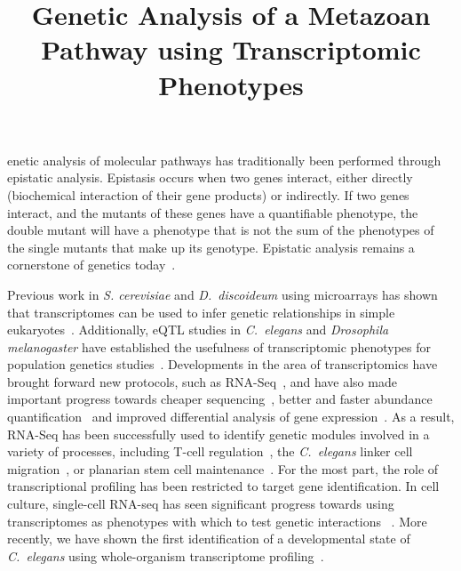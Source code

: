 \documentclass[9pt,twocolumn,twoside]{pnas-new}
\title{Genetic Analysis of a Metazoan Pathway using Transcriptomic Phenotypes}
\newcommand{\cel}{\emph{C.~elegans}}
\newcommand{\dicty}{\emph{D.~discoideum}}
\begin{document}
\verticaladjustment{-2pt}

\maketitle
\thispagestyle{firststyle}

enetic analysis of molecular pathways has traditionally been performed
through epistatic analysis. Epistasis occurs when two genes interact, either
directly (biochemical interaction of their gene products) or indirectly. If two
genes interact, and the mutants of these genes have a quantifiable phenotype,
the double mutant will have a phenotype that is not the sum of the phenotypes of
the single mutants that make up its genotype. Epistatic analysis remains a
cornerstone of genetics today~\cite{Phillips2008}.

Previous work in \emph{S. cerevisiae} and \dicty{} using microarrays has shown
that transcriptomes can be used to infer genetic relationships in simple
eukaryotes~\cite{Hughes2000, VanDriessche2005}. Additionally, eQTL studies in
\cel{} and \emph{Drosophila melanogaster} have established the usefulness of
transcriptomic phenotypes for population genetics studies~\cite{}.
Developments in the area of transcriptomics have brought forward new protocols,
such as RNA-Seq~\cite{Mortazavi2008}, and have also made important progress
towards cheaper sequencing~\cite{Metzker2010}, better and faster abundance
quantification~\cite{Patro2014,Bray2016,Patro2015} and improved differential
analysis of gene expression~\cite{Pimentel2016,Trapnell2013}.
As a result, RNA-Seq has been successfully used to identify genetic %
modules involved in a variety of processes, including T-cell
regulation~\cite{Singer2016,Shalek2013}, the \cel{} linker cell
migration~\cite{Schwarz2012}, or planarian stem cell
maintenance~\cite{VanWolfswinkel2014,Scimone2014}. For the most part,
the role of transcriptional profiling has been restricted to target gene
identification.
In cell culture, single-cell RNA-seq has seen significant progress towards using
transcriptomes as phenotypes with which to test genetic interactions
~\cite{Adamson2016,Dixit2016}.
More recently, we have shown the first identification of a developmental state
of \cel{} using whole-organism transcriptome profiling~\cite{Angeles-Albores2016a}.
\end{document}

